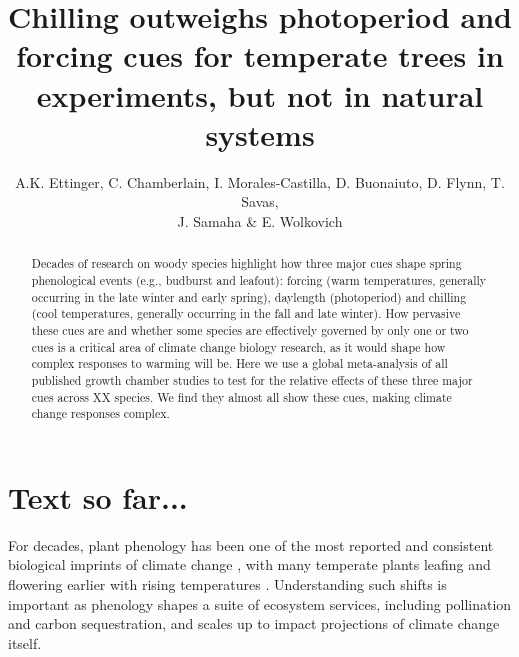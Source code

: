 \documentclass{article}
\begin{document}

\title{Chilling outweighs photoperiod and forcing cues for temperate trees in experiments, but not in natural systems} %

\author{A.K. Ettinger, C. Chamberlain, I. Morales-Castilla, D. Buonaiuto, D. Flynn, T. Savas, \\J. Samaha \& E. Wolkovich}
\maketitle  %

\begin{abstract}
Decades of research on woody species highlight how three major cues shape spring phenological events (e.g., budburst and leafout): forcing (warm temperatures, generally occurring in the late winter and early spring), daylength (photoperiod) and chilling (cool temperatures, generally occurring in the fall and late winter). How pervasive these cues are and whether some species are effectively governed by only one or two cues is a critical area of climate change biology research, as it would shape how complex responses to warming will be. Here we use a global meta-analysis of all published growth chamber studies to test for the relative effects of these three major cues across XX species. We find they almost all show these cues, making climate change responses complex. 
\end{abstract}

\section* {Text so far...}

\par For decades, plant phenology has been one of the most reported and consistent biological imprints of climate change \citep{IPCC:2014sm}, with many temperate plants leafing and flowering earlier with rising temperatures \citep{millerrushing2008,menzel2006}. Understanding such shifts is important as phenology shapes a suite of ecosystem services, including pollination and carbon sequestration, and scales up to impact projections of climate change itself. 
\end{document}
